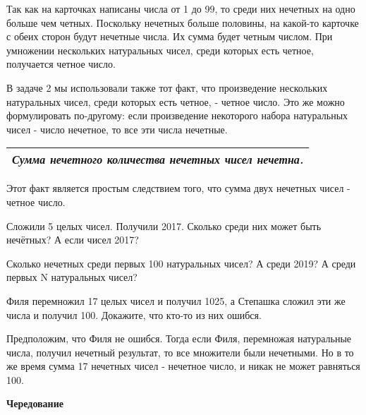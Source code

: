 \begin{prf}
	Так как на карточках написаны числа от 1 до 99, то среди них нечетных на одно больше чем четных. Поскольку нечетных больше половины, на какой-то карточке с обеих сторон будут нечетные числа. Их сумма будет четным числом. При умножении нескольких натуральных чисел, среди которых есть четное, получается четное число. 
\end{prf}

В задаче 2 мы использовали также тот факт, что произведение нескольких натуральных чисел, среди которых есть четное, - четное число. Это же можно формулировать по-другому: если произведение некоторого набора натуральных чисел - число нечетное, то все эти числа нечетные.


\begin{table}[h]\centering
	\begin{tabular}{|c|}
		\hline
		\textit{Сумма нечетного количества нечетных чисел нечетна.}\\
		\hline
	\end{tabular}
\end{table}

Этот факт является простым следствием того, что сумма двух нечетных чисел - четное число.

\begin{ex}
	Сложили 5 целых чисел. Получили 2017. Сколько среди них может быть нечётных? А если чисел 2017?
\end{ex}

\begin{ex}
	\label{u7}
	Сколько нечетных среди первых 100 натуральных	чисел?
	А среди 2019?  
	А среди первых N натуральных чисел?
\end{ex}

\begin{thm}
	Филя перемножил 17 целых чисел и получил 1025, а Степашка сложил эти же числа и получил 100. Докажите, что кто-то из них ошибся.
\end{thm}

\begin{prf}
	Предположим, что Филя не ошибся. Тогда если Филя, перемножая натуральные числа, получил нечетный результат, то все множители были нечетными. Но в то же время сумма 17 нечетных чисел - нечетное число, и никак не может равняться 100.
\end{prf}

\begin{center}
	{\large\textbf{Чередование}}
\end{center}

